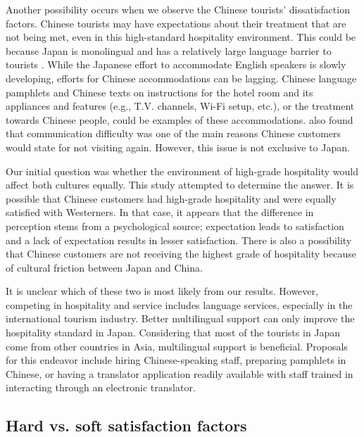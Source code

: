 \documentclass[smallextended,natbib]{svjour3}       %
\begin{document}
    Another possibility occurs when we observe the Chinese tourists’ dissatisfaction factors. Chinese tourists may have expectations about their treatment that are not being met, even in this high-standard hospitality environment. This could be because Japan is monolingual and has a relatively large language barrier to tourists \cite[][]{heinrich2012making,coulmas2002japan}. While the Japanese effort to accommodate English speakers is slowly developing, efforts for Chinese accommodations can be lagging. Chinese language pamphlets and Chinese texts on instructions for the hotel room and its appliances and features (e.g., T.V. channels, Wi-Fi setup, etc.), or the treatment towards Chinese people, could be examples of these accommodations. \cite{ryan2001} also found that communication difficulty was one of the main reasons Chinese customers would state for not visiting again. However, this issue is not exclusive to Japan.

    Our initial question was whether the environment of high-grade hospitality would affect both cultures equally. This study attempted to determine the answer. It is possible that Chinese customers had high-grade hospitality and were equally satisfied with Westerners. In that case, it appears that the difference in perception stems from a psychological source; expectation leads to satisfaction and a lack of expectation results in lesser satisfaction. There is also a possibility that Chinese customers are not receiving the highest grade of hospitality because of cultural friction between Japan and China.

    It is unclear which of these two is most likely from our results. However, competing in hospitality and service includes language services, especially in the international tourism industry. Better multilingual support can only improve the hospitality standard in Japan. Considering that most of the tourists in Japan come from other countries in Asia, multilingual support is beneficial. Proposals for this endeavor include hiring Chinese-speaking staff, preparing pamphlets in Chinese, or having a translator application readily available with staff trained in interacting through an electronic translator.

  \subsection{Hard vs. soft satisfaction factors}\label{disc:hard_soft}
\end{document}
